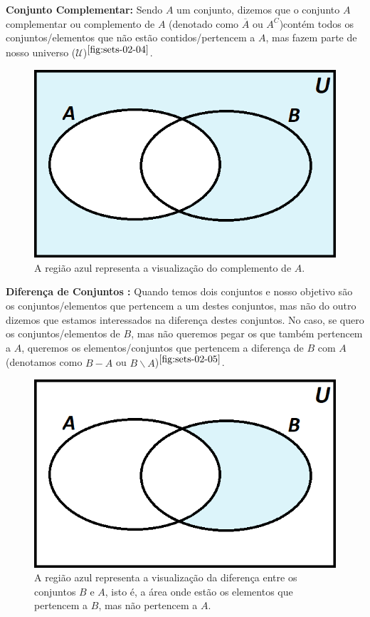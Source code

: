     \textbf{Conjunto Complementar:} Sendo $A$ um conjunto, dizemos que o conjunto $A$ complementar ou complemento de $A$ (denotado como $\overline A$ ou $A^C$)contém todos os conjuntos/elementos que não estão contidos/pertencem a $A$, mas fazem parte de nosso universo ($\mathcal U$)$^{\ref{fig:sets-02-04}}$.
    
    \begin{figure}[hbt!]
        \centering      
        \includegraphics[width = 7.5 cm]{figures/sets/fig-sets-02-04.png}
        \caption{A região azul representa a visualização do complemento de $A$.}
        \label{fig:sets-02-04}
    \end{figure}
    
    \textbf{Diferença de Conjuntos :} Quando temos dois conjuntos e nosso objetivo são os conjuntos/elementos que pertencem a um destes conjuntos, mas não do outro dizemos que estamos interessados na diferença destes conjuntos. No caso, se quero os conjuntos/elementos de $B$, mas não queremos pegar os que também pertencem a $A$, queremos os elementos/conjuntos que pertencem a diferença de $B$ com $A$ (denotamos como $B-A$ ou $B \backslash A$)$^{\ref{fig:sets-02-05}}$.
    
    \begin{figure}[hbt!]
        \centering      
        \includegraphics[width = 8 cm]{figures/sets/fig-sets-02-05.png}
        \caption{A região azul representa a visualização da diferença entre os conjuntos $B$ e $A$, isto é, a área onde estão os elementos que pertencem a $B$, mas não pertencem a $A$.}
        \label{fig:sets-02-05}
    \end{figure}
    
